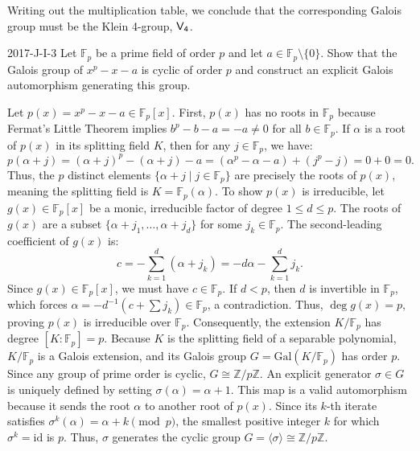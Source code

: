 \documentclass{article}
\begin{document}
	Writing out the multiplication table, we conclude that the corresponding Galois group must be the Klein 4-group, $\sf{V}_{4}$. 
	\begin{prb}{2017-J-I-3}
		Let $\mathbb{F}_{p}$ be a prime field of order $p$ and let $a \in \mathbb{F}_{p} \setminus \{0\}$. Show that the Galois group of $x^{p} - x - a$ is cyclic of order $p$ and construct an explicit Galois automorphism generating this group. 
	\end{prb}
	Let $p(x) = x^p - x - a \in \mathbb{F}_p[x]$. First, $p(x)$ has no roots in $\mathbb{F}_p$ because Fermat's Little Theorem implies $b^p - b - a = -a \neq 0$ for all $b \in \mathbb{F}_p$. If $\alpha$ is a root of $p(x)$ in its splitting field $K$, then for any $j \in \mathbb{F}_p$, we have:
	\begin{equation*}
		p(\alpha + j) = (\alpha + j)^p - (\alpha + j) - a = (\alpha^p - \alpha - a) + (j^p - j) = 0 + 0 = 0.
	\end{equation*}
	Thus, the $p$ distinct elements $\{\alpha + j \mid j \in \mathbb{F}_p\}$ are precisely the roots of $p(x)$, meaning the splitting field is $K = \mathbb{F}_p(\alpha)$. To show $p(x)$ is irreducible, let $g(x) \in \mathbb{F}_p[x]$ be a monic, irreducible factor of degree $1 \leq d \leq p$. The roots of $g(x)$ are a subset $\{\alpha + j_1, \dots, \alpha + j_d\}$ for some $j_k \in \mathbb{F}_p$. The second-leading coefficient of $g(x)$ is:
	\begin{equation*}
		c = -\sum_{k=1}^d (\alpha + j_k) = -d\alpha - \sum_{k=1}^d j_k.
	\end{equation*}
	Since $g(x) \in \mathbb{F}_p[x]$, we must have $c \in \mathbb{F}_p$. If $d < p$, then $d$ is invertible in $\mathbb{F}_p$, which forces $\alpha = -d^{-1}\left(c + \sum j_k\right) \in \mathbb{F}_p$, a contradiction. Thus, $\deg g(x) = p$, proving $p(x)$ is irreducible over $\mathbb{F}_p$. Consequently, the extension $K/\mathbb{F}_p$ has degree $[K:\mathbb{F}_p] = p$. Because $K$ is the splitting field of a separable polynomial, $K/\mathbb{F}_p$ is a Galois extension, and its Galois group $G = \text{Gal}(K/\mathbb{F}_p)$ has order $p$. Since any group of prime order is cyclic, $G \cong \mathbb{Z}/p\mathbb{Z}$. An explicit generator $\sigma \in G$ is uniquely defined by setting $\sigma(\alpha) = \alpha + 1$. This map is a valid automorphism because it sends the root $\alpha$ to another root of $p(x)$. Since its $k$-th iterate satisfies $\sigma^k(\alpha) = \alpha + k \pmod p$, the smallest positive integer $k$ for which $\sigma^k = \text{id}$ is $p$. Thus, $\sigma$ generates the cyclic group $G = \langle \sigma \rangle \cong \mathbb{Z}/p\mathbb{Z}$.
	
\end{document}
